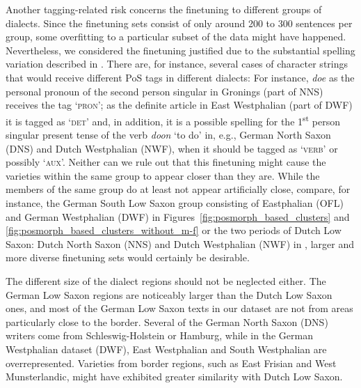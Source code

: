 \documentclass[output=paper,colorlinks,citecolor=brown]{langscibook}
\begin{document}
Another tagging-related risk concerns the finetuning to different groups of dialects. Since the finetuning sets consist of only around 200 to 300 sentences per group, some overfitting to a particular subset of the data might have happened. Nevertheless, we considered the finetuning justified due to the substantial spelling variation described in . There are, for instance, several cases of character strings that would receive different PoS tags in different dialects: For instance, \textit{doe} as the personal pronoun of the second person singular in Gronings (part of NNS) receives the tag `\textsc{pron}'; as the definite article in East Westphalian (part of DWF) it is tagged as `\textsc{det}' and, in addition, it is a possible spelling for the 1\textsuperscript{st} person singular present tense of the verb \textit{doon} `to do' in, e.g., German North Saxon (DNS) and Dutch Westphalian (NWF), when it should be tagged as `\textsc{verb}' or possibly `\textsc{aux}'. Neither can we rule out that this finetuning might cause the varieties within the same group to appear closer than they are. While the members of the same group do at least not appear artificially close, compare, for instance, the German South Low Saxon group consisting of Eastphalian (OFL) and German Westphalian (DWF) in Figures~\ref{fig:posmorph_based_clusters} and \ref{fig:posmorph_based_clusters_without_m-f} or the two periods of Dutch Low Saxon: Dutch North Saxon (NNS) and Dutch Westphalian (NWF) in , larger and more diverse finetuning sets would certainly be desirable. 

The different size of the dialect regions should not be neglected either. The German Low Saxon regions are noticeably larger than the Dutch Low Saxon ones, and most of the German Low Saxon texts in our dataset are not from areas particularly close to the border. Several of the German North Saxon (DNS) writers come from Schleswig-Holstein or Hamburg, while in the German Westphalian dataset (DWF), East Westphalian and South Westphalian are overrepresented. Varieties from border regions, such as East Frisian and West Munsterlandic, might have exhibited greater similarity with Dutch Low Saxon. 
\end{document}
